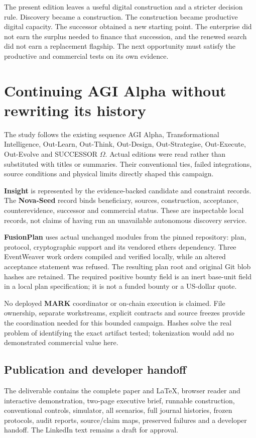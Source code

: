 The present edition leaves a useful digital construction and a stricter decision rule. Discovery became a construction. The construction became productive digital capacity. The successor obtained a new starting point. The enterprise did not earn the surplus needed to finance that succession, and the renewed search did not earn a replacement flagship. The next opportunity must satisfy the productive and commercial tests on its own evidence.

\section{Continuing AGI Alpha without rewriting its history}
The study follows the existing sequence AGI Alpha, Transformational Intelligence, Out-Learn, Out-Think, Out-Design, Out-Strategise, Out-Execute, Out-Evolve and SUCCESSOR $\Omega$. Actual editions were read rather than substituted with titles or summaries. Their conventional ties, failed integrations, source conditions and physical limits directly shaped this campaign.\cite{ti,economy,tae,outlearn,outthink,outdesign,outstrategise,outexecute,outevolve}

\textbf{Insight} is represented by the evidence-backed candidate and constraint records. The \textbf{Nova-Seed} record binds beneficiary, sources, construction, acceptance, counterevidence, successor and commercial status. These are inspectable local records, not claims of having run an unavailable autonomous discovery service.

\textbf{FusionPlan} uses actual unchanged modules from the pinned repository: plan, protocol, cryptographic support and its vendored ethers dependency. Three EventWeaver work orders compiled and verified locally, while an altered acceptance statement was refused. The resulting plan root and original Git blob hashes are retained. The required positive bounty field is an inert base-unit field in a local plan specification; it is not a funded bounty or a US-dollar quote.

No deployed \textbf{MARK} coordinator or on-chain execution is claimed. File ownership, separate workstreams, explicit contracts and source freezes provide the coordination needed for this bounded campaign. Hashes solve the real problem of identifying the exact artifact tested; tokenization would add no demonstrated commercial value here.

\subsection{Publication and developer handoff}
The deliverable contains the complete paper and LaTeX, browser reader and interactive demonstration, two-page executive brief, runnable construction, conventional controls, simulator, all scenarios, full journal histories, frozen protocols, audit reports, source/claim maps, preserved failures and a developer handoff. The LinkedIn text remains a draft for approval.

